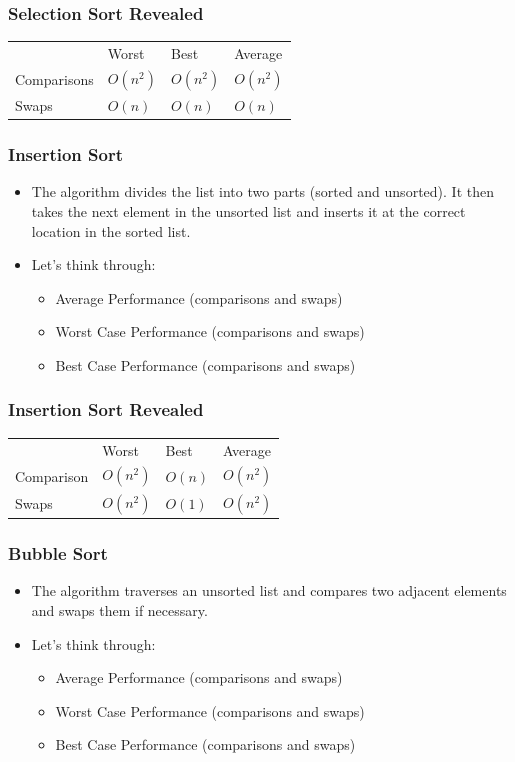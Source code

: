 \documentclass[11pt]{article}
\begin{document}
\subsubsection{Selection Sort Revealed}
\label{sec:org42daac5}
\begin{center}
\begin{tabular}{llll}
 & Worst & Best & Average\\
Comparisons & \(O(n^2)\) & \(O(n^2)\) & \(O(n^2)\)\\
Swaps & \(O(n)\) & \(O(n)\) & \(O(n)\)\\
\end{tabular}
\end{center}
\subsubsection{Insertion Sort}
\label{sec:org76936c5}
\begin{itemize}
\item The algorithm divides the list into two parts (sorted and unsorted).  It then takes the next element in the unsorted list and inserts it at the correct location in the sorted list.
\item Let's think through:
\begin{itemize}
\item Average Performance (comparisons and swaps)
\item Worst Case Performance (comparisons and swaps)
\item Best Case Performance (comparisons and swaps)
\end{itemize}
\end{itemize}
\subsubsection{Insertion Sort Revealed}
\label{sec:org3996292}
\begin{center}
\begin{tabular}{llll}
 & Worst & Best & Average\\
Comparison & \(O(n^2)\) & \(O(n)\) & \(O(n^2)\)\\
Swaps & \(O(n^2)\) & \(O(1)\) & \(O(n^2)\)\\
\end{tabular}
\end{center}
\subsubsection{Bubble Sort}
\label{sec:org9c0e961}
\begin{itemize}
\item The algorithm traverses an unsorted list and compares two adjacent elements and swaps them if necessary.
\item Let's think through:
\begin{itemize}
\item Average Performance (comparisons and swaps)
\item Worst Case Performance (comparisons and swaps)
\item Best Case Performance (comparisons and swaps)
\end{itemize}
\end{itemize}
\end{document}
